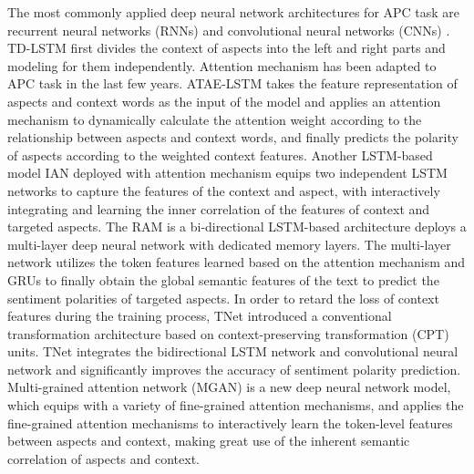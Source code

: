 \documentclass[a4paper,fleqn]{cas-sc}
\begin{document}
The most commonly applied deep neural network architectures for APC task are recurrent neural networks \cite{tang2016effective, wang2016attention, ma2017interactive, li2018transformation, huang2018aspect} (RNNs) and convolutional neural networks (CNNs) \cite{xue2018aspect, chen2017improving, zhang2018textual}. 
TD-LSTM \cite{tang2016effective} first divides the context of aspects into the left and right parts and modeling for them independently.
Attention mechanism \cite{bahdanau2014neural} has been adapted to APC task in the last few years. ATAE-LSTM takes the feature representation of aspects and context words as the input of the model and applies an attention mechanism to dynamically calculate the attention weight according to the relationship between aspects and context words, and finally predicts the polarity of aspects according to the weighted context features.
Another LSTM-based model IAN \cite{ma2017interactive} deployed with attention mechanism equips two independent LSTM networks to capture the features of the context and aspect, with interactively integrating and learning the inner correlation of the features of context and targeted aspects. The RAM \cite{chen2017recurrent} is a bi-directional LSTM-based architecture deploys a multi-layer deep neural network with dedicated memory layers. The multi-layer network utilizes the token features learned based on the attention mechanism and GRUs to finally obtain the global semantic features of the text to predict the sentiment polarities of targeted aspects. In order to retard the loss of context features during the training process, TNet \cite{li2018transformation} introduced a conventional transformation architecture based on context-preserving transformation (CPT) units. TNet integrates the bidirectional LSTM network and convolutional neural network and significantly improves the accuracy of sentiment polarity prediction. Multi-grained attention network \cite{fan2018multi} (MGAN) is a new deep neural network model, which equips with a variety of fine-grained attention mechanisms, and applies the fine-grained attention mechanisms to interactively learn the token-level features between aspects and context, making great use of the inherent semantic correlation of aspects and context.
\end{document}
